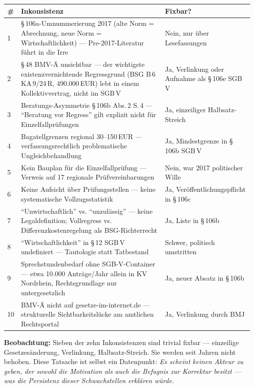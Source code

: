 \documentclass{umbruch-position}
\begin{document}
{\small
\begin{longtable}{p{0.4cm} p{8cm} p{4.5cm}}
\toprule
\textbf{\#} & \textbf{Inkonsistenz} & \textbf{Fixbar?} \\
\midrule
1 & \S\,106a-Umnummerierung 2017 (alte Norm = Abrechnung, neue Norm = Wirtschaftlichkeit) — Pre-2017-Literatur führt in die Irre & Nein, nur über Lesefassungen \\
2 & \S\,48 BMV-Ä unsichtbar — der wichtigste existenzvernichtende Regressgrund (BSG B\,6\,KA\,9/24\,R, 490.000\,EUR) lebt in einem Kollektivvertrag, nicht im SGB\,V & Ja, Verlinkung oder Aufnahme als \S\,106e SGB\,V \\
3 & Beratungs-Asymmetrie \S\,106b Abs.\,2 S.\,4 — ``Beratung vor Regress'' gilt explizit nicht für Einzelfallprüfungen & Ja, einzeiliger Halbsatz-Streich \\
4 & Bagatellgrenzen regional 30--150\,EUR — verfassungsrechtlich problematische Ungleichbehandlung & Ja, Mindestgrenze in \S\,106b SGB\,V \\
5 & Kein Bauplan für die Einzelfallprüfung — Verweis auf 17 regionale Prüfvereinbarungen & Nein, war 2017 politischer Wille \\
6 & Keine Aufsicht über Prüfungsstellen — keine systematische Vollzugsstatistik & Ja, Veröffentlichungspflicht in \S\,106c \\
7 & ``Unwirtschaftlich'' vs. ``unzulässig'' — keine Legaldefinition; Vollregress vs. Differenzkostenregelung als BSG-Richterrecht & Ja, Liste in \S\,106b \\
8 & ``Wirtschaftlichkeit'' in \S\,12 SGB\,V undefiniert — Tautologie statt Tatbestand & Schwer, politisch umstritten \\
9 & Sprechstundenbedarf ohne SGB-V-Container — etwa 10.000 Anträge/Jahr allein in KV Nordrhein, Rechtsgrundlage nur untergesetzlich & Ja, neuer Absatz in \S\,106b \\
10 & BMV-Ä nicht auf gesetze-im-internet.de — strukturelle Sichtbarkeitslücke am amtlichen Rechtsportal & Ja, Verlinkung durch BMJ \\
\bottomrule
\end{longtable}
}

\textbf{Beobachtung:} Sieben der zehn Inkonsistenzen sind trivial fixbar — einzeilige Gesetzesänderung, Verlinkung, Halbsatz-Streich. Sie werden seit Jahren nicht behoben. Diese Tatsache ist selbst ein Datenpunkt: \textit{Es scheint keinen Akteur zu geben, der sowohl die Motivation als auch die Befugnis zur Korrektur besitzt --- was die Persistenz dieser Schwachstellen erklären würde.}
\end{document}
